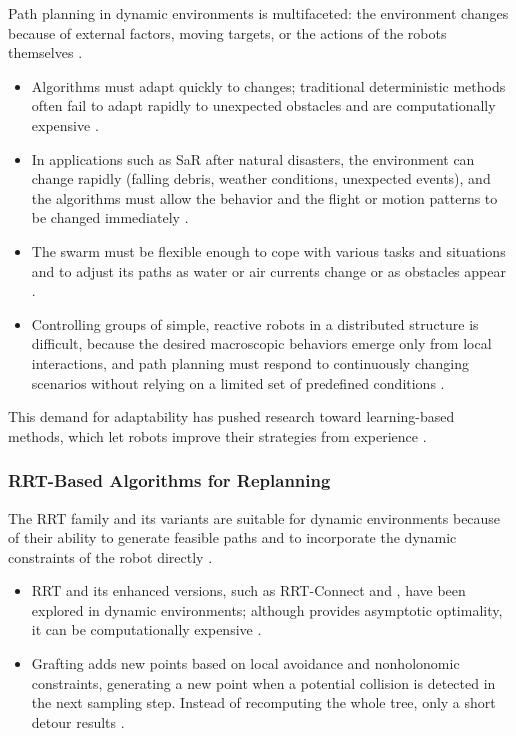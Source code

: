Path planning in dynamic environments is multifaceted: the environment changes
because of external factors, moving targets, or the actions of the robots
themselves \cite{tan2016handbook}.
\begin{itemize}
  \item {} Algorithms must adapt quickly to
        changes; traditional deterministic methods often fail to adapt rapidly to
        unexpected obstacles and are computationally expensive \cite{abujabal2024path}.
  \item {} In applications such as SaR after
        natural disasters, the environment can change rapidly (falling debris,
        weather conditions, unexpected events), and the algorithms must allow the
        behavior and the flight or motion patterns to be changed immediately
        \cite{bhowmick2024bio}.
  \item {} The swarm must be flexible enough to
        cope with various tasks and situations and to adjust its paths as water
        or air currents change or as obstacles appear \cite{tan2013research}.
  \item {} Controlling groups of simple,
        reactive robots in a distributed structure is difficult, because the
        desired macroscopic behaviors emerge only from local interactions, and
        path planning must respond to continuously changing scenarios without
        relying on a limited set of predefined conditions
        \cite{brambilla2013swarm}.
\end{itemize}
This demand for adaptability has pushed research toward learning-based methods,
which let robots improve their strategies from experience
\cite{kuckling2023recent}.

\subsubsection{RRT-Based Algorithms for Replanning}

The RRT family and its variants are suitable for dynamic environments because of
their ability to generate feasible paths and to incorporate the dynamic
constraints of the robot directly \cite{li2021rrt}.
\begin{itemize}
  \item {} RRT and its enhanced versions, such as
        RRT-Connect and \RRTstar, have been explored in dynamic environments;
        although \RRTstar{} provides asymptotic optimality, it can be
        computationally expensive \cite{chen2025survey}.
  \item {} Grafting adds new points based on
        local avoidance and nonholonomic constraints, generating a new point when
        a potential collision is detected in the next sampling step. Instead of
        recomputing the whole tree, only a short detour results \cite{li2021rrt}.
\end{itemize}

